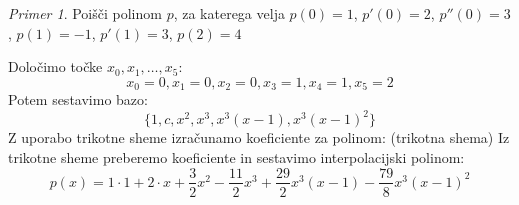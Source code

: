 \documentclass[a4paper,12pt]{article}
\theoremstyle{definition}
\theoremstyle{remark}
\newtheorem*{ex}{Primer}
\begin{document}
\begin{ex}
    Poišči polinom $p$, za katerega velja $p(0) = 1$, $p'(0) = 2$, $p''(0) = 3$, $p(1) = -1$, $p'(1) = 3$, $p(2) = 4$

    Določimo točke $x_0, x_1, \dots, x_5$:
    \begin{equation*}
        x_0 = 0, x_1 = 0, x_2 = 0, x_3 = 1, x_4 = 1, x_5 = 2
    \end{equation*}
    Potem sestavimo bazo:
    \begin{equation}
        \{1, c, x^2, x^3, x^3(x-1), x^3(x-1)^2\}
    \end{equation}
    Z uporabo trikotne sheme izračunamo koeficiente za polinom:
    (trikotna shema)
    Iz trikotne sheme preberemo koeficiente in sestavimo interpolacijski polinom:
    \begin{equation}
        p(x) = 1 \cdot 1 + 2 \cdot x + \frac{3}{2} x^2 - \frac{11}{2}x^3 + \frac{29}{2}x^3(x-1) - \frac{79}{8} x^3(x-1)^2
    \end{equation}
\end{ex}
\end{document}
